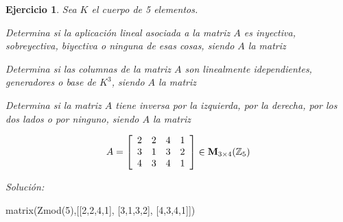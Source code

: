\documentclass[12pt]{amsart}
\newtheorem{ejer}{Ejercicio}
\begin{document}
\begin{ejer} Sea $K$ el cuerpo de 5 elementos.
\newline
\noindent\begin{minipage}{\textwidth}
\begin{tcolorbox}[colback = green!20!white,title=Versión Aplicaciones]
Determina si la aplicaci\'on lineal asociada a la matriz $A$ es inyectiva, sobreyectiva, biyectiva o ninguna de esas cosas, siendo $A$ la matriz \end{tcolorbox}
\end{minipage} \newline
\noindent\begin{minipage}{\textwidth}
\begin{tcolorbox}[colback = blue!20!white,title=Versión Vectores]
Determina si las columnas de la matriz $A$ son linealmente idependientes, generadores o base de $K^{3}$, siendo $A$ la matriz \end{tcolorbox}
\end{minipage} \newline
\noindent\begin{minipage}{\textwidth} 
\begin{tcolorbox}[colback = red!20!white,title=Versión Inversas]
Determina si la matriz $A$ tiene inversa por la izquierda, por la derecha, por los dos lados o por ninguno, siendo $A$ la matriz 
\end{tcolorbox}
\end{minipage}
\[ A = \left[\begin{array}{rrrr}
2 & 2 & 4 & 1 \\
3 & 1 & 3 & 2 \\
4 & 3 & 4 & 1
\end{array}\right] \in {\bf M}_{3\times 4}({\mathbb Z}_{5})\]
\end{ejer}

{\it Soluci\'on:}

\begin{sageblock}
matrix(Zmod(5),[[2,2,4,1],
[3,1,3,2],
[4,3,4,1]])
\end{sageblock}

\end{document}
